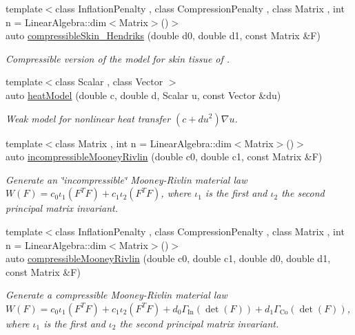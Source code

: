 \begin{DoxyCompactItemize}
{\footnotesize template$<$class Inflation\-Penalty , class Compression\-Penalty , class Matrix , int n = Linear\-Algebra\-::dim$<$\-Matrix$>$()$>$ }\\auto \hyperlink{group__Biomechanics_ga42721e772b7eada1b0bca98247ad440f}{compressible\-Skin\-\_\-\-Hendriks} (double d0, double d1, const Matrix \&F)
\begin{DoxyCompactList}\small\item\em Compressible version of the model for skin tissue of \cite{Hendriks2005}. \end{DoxyCompactList}\item 
{\footnotesize template$<$class Scalar , class Vector $>$ }\\auto \hyperlink{namespaceFunG_aab17a1468e61f58564333b3fcd7900d6}{heat\-Model} (double c, double d, Scalar u, const Vector \&du)
\begin{DoxyCompactList}\small\item\em Weak model for nonlinear heat transfer $ (c+du^2)\nabla u $. \end{DoxyCompactList}\item 
{\footnotesize template$<$class Matrix , int n = Linear\-Algebra\-::dim$<$\-Matrix$>$()$>$ }\\auto \hyperlink{group__Rubber_gace19173e33490aadd36ae3a03fd1d85c}{incompressible\-Mooney\-Rivlin} (double c0, double c1, const Matrix \&F)
\begin{DoxyCompactList}\small\item\em Generate an \char`\"{}incompressible\char`\"{} Mooney-\/\-Rivlin material law $ W(F)=c_0\iota_1(F^T F) + c_1\iota_2(F^T F) $, where $\iota_1$ is the first and $\iota_2$ the second principal matrix invariant. \end{DoxyCompactList}\item 
{\footnotesize template$<$class Inflation\-Penalty , class Compression\-Penalty , class Matrix , int n = Linear\-Algebra\-::dim$<$\-Matrix$>$()$>$ }\\auto \hyperlink{group__Rubber_ga9a1894daa10a0bdcc620c6c41ecb6f19}{compressible\-Mooney\-Rivlin} (double c0, double c1, double d0, double d1, const Matrix \&F)
\begin{DoxyCompactList}\small\item\em Generate a compressible Mooney-\/\-Rivlin material law $ W(F)=c_0\iota_1(F^T F) + c_1\iota_2(F^T F) + d_0\Gamma_\mathrm{In}(\det(F))+d_1\Gamma_\mathrm{Co}(\det(F)) $, where $\iota_1$ is the first and $\iota_2$ the second principal matrix invariant. \end{DoxyCompactList}\item 

\end{DoxyCompactItemize}
